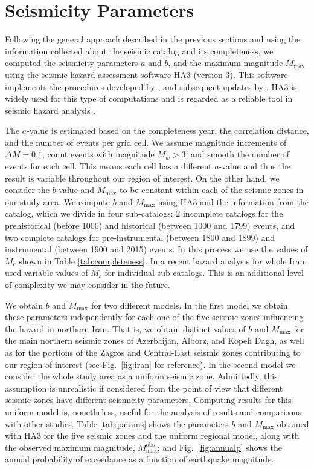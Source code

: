 \section{Seismicity Parameters}

Following the general approach described in the previous sections and using the information collected about the seismic catalog and its completeness, we computed the seismicity parameters $a$ and $b$, and the maximum magnitude $M_{\max}$ using the seismic hazard assessment software HA3 (version 3). This software implements the procedures developed by \citet{Kijko_1989_BSSA, Kijko_1992_BSSA}, and subsequent updates by \citet{Kijko_2004_PAG}. HA3 is widely used for this type of computations and is regarded as a reliable tool in seismic hazard analysis \citep[see, for instance,][]{Karimiparidari2013, Khodaverdian_2016_BSSA}.

The $a$-value is estimated based on the completeness year, the correlation distance, and the number of events per grid cell. We assume magnitude increments of $\Delta M = 0.1$, count events with magnitude $M_w > 3$, and smooth the number of events for each cell. This means each cell has a different $a$-value and thus the result is variable throughout our region of interest. On the other hand, we consider the $b$-value and $M_{\max}$ to be constant within each of the seismic zones in our study area. We compute $b$ and $M_{\max}$ using HA3 and the information from the catalog, which we divide in four sub-catalogs: 2 incomplete catalogs for the prehistorical (before 1000) and historical (between 1000 and 1799) events, and two complete catalogs for pre-instrumental (between 1800 and 1899) and instrumental (between 1900 and 2015) events. In this process we use the values of $M_c$ shown in Table \ref{tab:completeness}. In a recent hazard analysis for whole Iran, \citet{} used variable values of $M_c$ for individual sub-catalogs. This is an additional level of complexity we may consider in the future. 

We obtain $b$ and $M_{\max}$ for two different models. In the first model we obtain these parameters independently for each one of the five seismic zones influencing the hazard in northern Iran. That is, we obtain distinct values of $b$ and $M_{\max}$ for the main northern seismic zones of Azerbaijan, Alborz, and Kopeh Dagh, as well as for the portions of the Zagros and Central-East seismic zones contributing to our region of interest (see Fig.~\ref{fig:iran} for reference). In the second model we consider the whole study area as a uniform seismic zone. Admittedly, this assumption is unrealistic if considered from the point of view that different seismic zones have different seismicity parameters. Computing results for this uniform model is, nonetheless, useful for the analysis of results and comparisons with other studies. Table \ref{tab:params} shows the parameters $b$ and $M_{\max}$ obtained with HA3 for the five seismic zones and the uniform regional model, along with the observed maximum magnitude, $M_{\max}^{\mathrm{obs}}$; and Fig.~\ref{fig:annualp} shows the annual probability of exceedance as a function of earthquake magnitude.

